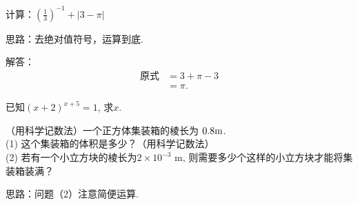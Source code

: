 \item{
    计算：$ (\frac{1}{3})^{-1} + \lvert 3-\pi \rvert $
    
    \fangsong{}
    思路：去绝对值符号，运算到底.

    解答：
    \begin{align*}
        \mbox{原式} &= 3 + \pi - 3\\
        &= \pi.
    \end{align*}
}
\item{
    已知$(x+2)^{x+5}=1$, 求$x$.
}
\item{
    （用科学记数法）一个正方体集装箱的棱长为 $0.8 \rm{m}$.\\
    (1) 这个集装箱的体积是多少？（用科学记数法）\\
    (2) 若有一个小立方块的棱长为$2\times 10^{-3} $ m, 则需要多少个这样的小立方块才能将集装箱装满？

    \fangsong{}
    思路：问题（2）注意简便运算.
}
